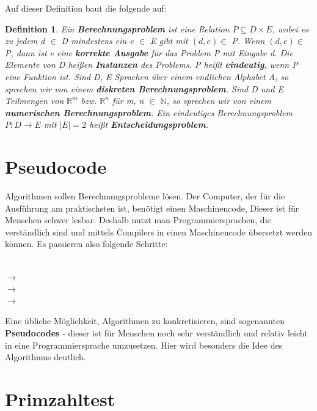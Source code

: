 \documentclass{article}
\newcommand{\R}{\mathbb{R}}%
\newcommand{\N}{\mathbb{N}}%
\newtheorem{definition}[thm]{Definition} %
\begin{document}
Auf dieser Definition baut die folgende auf: 

\begin{definition}
     Ein \textbf{Berechnungsproblem} ist eine Relation $P \subseteq D \times E$, wobei es zu jedem d $\in$ D mindestens ein e $\in$ E gibt mit $(d,e) \in $ P. Wenn $(d,e) \in$ P, dann ist e eine \textbf{korrekte Ausgabe} für das Problem P mit Eingabe d. Die Elemente von D heißen \textbf{Instanzen} des Problems. P heißt \textbf{eindeutig}, wenn P eine Funktion ist. Sind D, E Sprachen über einem endlichen Alphabet A, so sprechen wir von einem \textbf{diskreten Berechnungsproblem}. Sind D und E Teilmengen von $\R^m$ bzw. $\R^n$ für m, n $\in$ $\N$, so sprechen wir von einem \textbf{numerischen Berechnungsproblem}. Ein eindeutiges Berechnungsproblem $P\colon D \to E$  %
     mit $\left| E \right| = 2$ heißt \textbf{Entscheidungsproblem}. 
\end{definition}

\section{Pseudocode}

Algorithmen sollen Berechnungsprobleme lösen. Der Computer, der für die Ausführung am praktischsten ist, benötigt einen Maschinencode, Dieser ist für Menschen schwer lesbar. Deshalb nutzt man Programmiersprachen, die verständlich sind und mittels Compilers in einen Maschinencode übersetzt werden können. Es passieren also folgende Schritte:

\begin{center}
    
 \\
$\rightarrow$
\\
$\rightarrow$
\\
$\rightarrow$

\end{center}

Eine übliche Möglichkeit, Algorithmen zu konkretisieren, sind sogenannten \textbf{Pseudocodes} - dieser ist für Menschen noch sehr verständlich und relativ leicht in eine Programmiersprache umzusetzen. Hier wird besonders die Idee des Algorithmus deutlich.


\section{Primzahltest}
\end{document}
